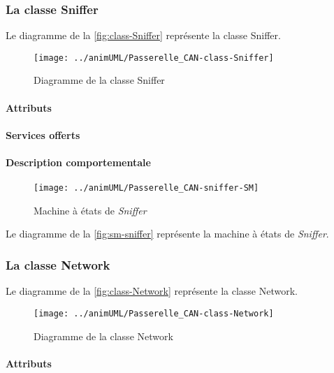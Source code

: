 \subsubsection{La classe Sniffer}

Le diagramme de la \autoref{fig:class-Sniffer} représente la classe Sniffer.
\begin{figure}[H]
	\centering
	\texttt{[image: ../animUML/Passerelle\_CAN-class-Sniffer]}
	\caption{Diagramme de la classe Sniffer}
	\label{fig:class-Sniffer}
\end{figure}


\paragraph{Attributs}
\classSnifferProperties
\paragraph{Services offerts}
\classSnifferOperations
\paragraph{Description comportementale}
\begin{figure}[H]
	\centering
	\texttt{[image: ../animUML/Passerelle\_CAN-sniffer-SM]}
	\caption{Machine à états de \emph{Sniffer}}
	\label{fig:sm-sniffer}
\end{figure}
Le diagramme de la \autoref{fig:sm-sniffer} représente la machine à états de \emph{Sniffer}.

\subsubsection{La classe Network}

Le diagramme de la \autoref{fig:class-Network} représente la classe Network.
\begin{figure}[H]
	\centering
	\texttt{[image: ../animUML/Passerelle\_CAN-class-Network]}
	\caption{Diagramme de la classe Network}
	\label{fig:class-Network}
\end{figure}


\paragraph{Attributs}
\classNetworkProperties
